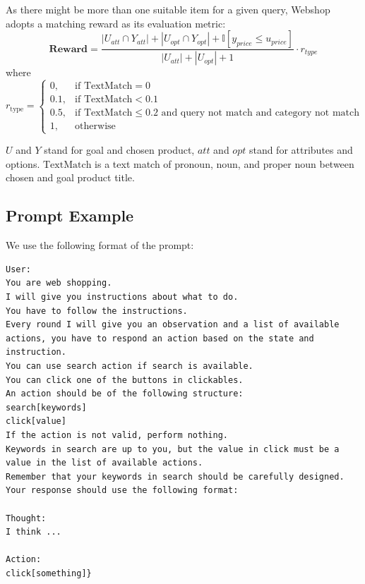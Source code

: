 As there might be more than one suitable item for a given query, Webshop adopts a matching reward as its evaluation metric:
\begin{equation}
    \textbf{Reward} = \frac{|U_{att} \cap Y_{att}| + |U_{opt} \cap Y_{opt}| + \mathbb{I} [y_{price} \leq u_{price}]}{|U_{att}| + |U_{opt}| + 1} \cdot r_{type}
\end{equation}
where
\begin{equation}
    r_{\text{type}} = 
    \begin{cases}
        0, & \text{if } \text{TextMatch} = 0\\
        0.1, & \text{if } \text{TextMatch} < 0.1\\
        0.5, & \text{if } \text{TextMatch} \leq 0.2 \text{ and } \text{query not match} \text{ and } \text{category not match}\\
        1, & \text{otherwise}
    \end{cases}
\end{equation}

$U$ and $Y$ stand for goal and chosen product, $att$ and $opt$ stand for attributes and options. $\text{TextMatch}$ is a text match of pronoun, noun, and proper noun between chosen and goal product title.

\subsection{Prompt Example}
We use the following format of the prompt:
\begin{lstlisting}
User:
You are web shopping.
I will give you instructions about what to do.
You have to follow the instructions.
Every round I will give you an observation and a list of available actions, you have to respond an action based on the state and instruction.
You can use search action if search is available.
You can click one of the buttons in clickables.
An action should be of the following structure:
search[keywords]
click[value]
If the action is not valid, perform nothing.
Keywords in search are up to you, but the value in click must be a value in the list of available actions.
Remember that your keywords in search should be carefully designed.
Your response should use the following format:

Thought:
I think ...

Action:
click[something]}
\end{lstlisting}

